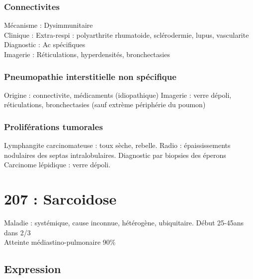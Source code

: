 \documentclass{article}
\begin{document}
\subsubsection{Connectivites}
Mécanisme : Dysimmunitaire\\
Clinique : Extra-respi : polyarthrite rhumatoide, sclérodermie, lupus, vascularite\\
Diagnostic : Ac spécifiques\\
Imagerie : Réticulations, hyperdensités, bronchectasies

\subsubsection{Pneumopathie interstitielle non spécifique}
Origine : connectivite, médicaments (idiopathique)
Imagerie : verre dépoli, réticulations, bronchectasies (sauf extrème périphérie du poumon)

\subsubsection{Proliférations tumorales}
Lymphangite carcinomateuse : toux sèche, rebelle. Radio : épaississements nodulaires des septas intralobulaires. Diagnostic par biopsies des éperons\\
Carcinome lépidique : verre dépoli. 


\section{207 : Sarcoidose}
Maladie : systémique, cause inconnue, hétérogène, ubiquitaire. Début 25-45ans
dans 2/3\\
Atteinte médiastino-pulmonaire 90\%

\subsection{Expression}
\label{sec:org39048da}
\end{document}
